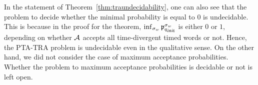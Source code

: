 \begin{remark}
In the statement of Theorem~\ref{thm:traundecidability}, one can also see that the problem to decide whether the minimal probability is equal to $0$ is undecidable. This is because in the proof for the theorem, 
$\inf_{\sigma_w}\mathfrak{p}_{q_{\mbox{\sl\scriptsize init} }}^{\sigma_w}$ is either $0$ or $1$, depending on whether $\mathcal{A}$ accepts all time-divergent timed words or not. Hence, the PTA-TRA problem is undecidable even in the qualitative sense.
On the other hand, we did not consider the case of maximum acceptance probabilities.
Whether the problem to maximum acceptance probabilities is decidable or not is left open. 
\end{remark}